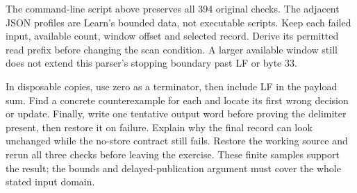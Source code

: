 The command-line script above preserves all 394 original checks. The adjacent
JSON profiles are Learn's bounded data, not executable scripts. Keep each failed
input, available count, window offset and selected record. Derive its permitted
read prefix before changing the scan condition. A larger available window still
does not extend this parser's stopping boundary past LF or byte 33.

In disposable copies, use zero as a terminator, then include LF in the payload
sum. Find a concrete counterexample for each and locate its first wrong decision
or update. Finally, write one tentative output word before proving the delimiter
present, then restore it on failure. Explain why the final record can look
unchanged while the no-store contract still fails. Restore the working source
and rerun all three checks before leaving the exercise. These finite samples
support the result; the bounds and delayed-publication argument must cover the
whole stated input domain.


